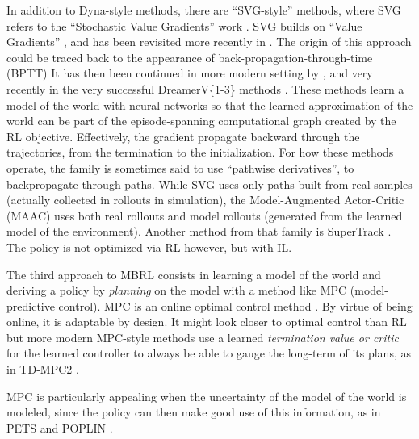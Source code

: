 \documentclass[12pt,a4paper]{article}
\begin{document}
In addition to Dyna-style methods, there are ``SVG-style'' methods, where SVG refers to the
``Stochastic Value Gradients'' work \cite{Heess2015-va}.
SVG builds on ``Value Gradients'' \cite{Fairbank2012-rp},
and has been revisited more recently in \cite{Amos2021-wd}.
The origin of this approach could be traced back to the appearance of
back-propagation-through-time (BPTT)
\cite{Rumelhart1986-ls, Robinson1987-px, Nguyen1990-zx, Werbos1990-qa,
Williams1990-xw, Jordan1992-wn, Grzeszczuk1998-ij}
It has then been continued in more modern setting by \cite{Schmidhuber2011-mt, Deisenroth2011-ya}, 
and very recently in the very successful DreamerV\{1-3\} methods
\cite{Hafner2019-oa, Hafner2021-td, Hafner2023-wk, Lin2023-ql}.
These methods learn a model of the world with neural networks so that the learned approximation of
the world can be part of the episode-spanning computational graph created by the RL objective.
Effectively, the gradient propagate backward through the trajectories, from the termination to
the initialization.
For how these methods operate, the family is sometimes said to use ``pathwise derivatives'',
to backpropagate through paths.
While SVG uses only paths built from real samples (actually collected in rollouts in simulation),
the Model-Augmented Actor-Critic (MAAC) \cite{Clavera2020-ha}
uses both real rollouts and model rollouts (generated from the learned model of the environment).
Another method from that family is SuperTrack \cite{Fussell2021-uf}.
The policy is not optimized via RL however, but with IL.

The third approach to MBRL consists in learning a model of the world and deriving a
policy by \emph{planning} on the model with a method like MPC (model-predictive control).
MPC is an online optimal control method
\cite{Bryson1969-mg, Bertsekas2000-yi, Kirk2004-dq}.
By virtue of being online, it is adaptable by design.
It might look closer to optimal control than RL but more modern
MPC-style methods use a learned \textit{termination value or critic}
for the learned controller to always be able to gauge the long-term of its plans, as in
TD-MPC2 \cite{Hansen2024-ld}.

MPC is particularly appealing when the uncertainty of the model of the world is modeled,
since the policy can then make good use of this information,
as in PETS \cite{Chua2018-fn} and POPLIN \cite{Wang2020-jd}.
\end{document}
